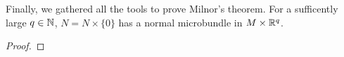 Finally, we gathered all the tools to prove Milnor's theorem.
For a sufficently large $q \in \mathbb{N}$, $N = N \times \{0\}$ has a normal microbundle in $M \times \mathbb{R}^q$.
\begin{proof}

\end{proof}